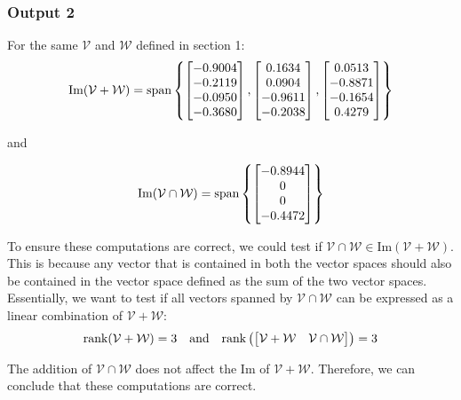 \documentclass[10pt]{article}
\begin{document}
\subsubsection{Output 2}
For the same $\mathcal{V}$ and $\mathcal{W}$ defined in section 1:
\begin{equation*}
    \text{Im}({\mathcal{V} + \mathcal{W}}) = \text{span}
    \begin{Bmatrix}
        \begin{bmatrix} -0.9004\\-0.2119\\-0.0950\\-0.3680 \end{bmatrix},
        \begin{bmatrix} 0.1634\\0.0904\\-0.9611\\-0.2038 \end{bmatrix},
        \begin{bmatrix} 0.0513\\-0.8871\\-0.1654\\0.4279 \end{bmatrix}
    \end{Bmatrix}
\end{equation*}
\begin{center}
    and
\end{center}
\begin{equation*}
    \text{Im}({\mathcal{V} \cap \mathcal{W}}) = \text{span}
    \begin{Bmatrix}
        \begin{bmatrix} -0.8944\\0\\0\\-0.4472 \end{bmatrix}
    \end{Bmatrix}
\end{equation*}

To ensure these computations are correct, we could test if ${\mathcal{V} \cap \mathcal{W}} \in \text{Im}({\mathcal{V} + \mathcal{W}})$. This is because any vector that is contained in both the vector spaces should also be contained in the vector space defined as the sum of the two vector spaces. Essentially, we want to test if all vectors spanned by ${\mathcal{V} \cap \mathcal{W}}$ can be expressed as a linear combination of $\mathcal{V} + \mathcal{W}$:
\begin{equation*}
    \text{rank}(\mathcal{V} + \mathcal{W}) = 3
    \quad
    \text{and}
    \quad
    \text{rank}\left(\begin{bmatrix} \mathcal{V} + \mathcal{W} & \mathcal{V} \cap \mathcal{W} \end{bmatrix}\right) = 3
\end{equation*}

The addition of $\mathcal{V} \cap \mathcal{W}$ does not affect the $\text{Im}$ of $\mathcal{V} + \mathcal{W}$. Therefore, we can conclude that these computations are correct.
\end{document}
